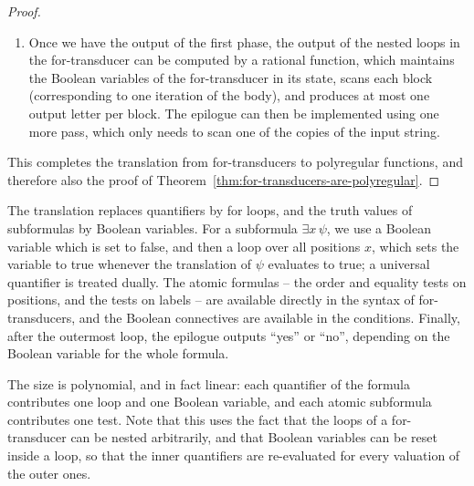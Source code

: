 \begin{proof}
\begin{enumerate}
  \item Once we have the output of the first phase, the output of the nested loops in the for-transducer can be computed by a rational function, which maintains the Boolean variables of the for-transducer in its state, scans each block (corresponding to one iteration of the body), and produces at most one output letter per block. The epilogue can then be implemented using one more pass, which only needs to scan one of the copies of the input string.
\end{enumerate}
This completes the translation from for-transducers to polyregular functions, and therefore also the proof of Theorem~\ref{thm:for-transducers-are-polyregular}.
\end{proof}

\exerciseheader

{The translation replaces quantifiers by for loops, and the truth values of subformulas by Boolean variables. For a subformula $\exists x\, \psi$, we use a Boolean variable which is set to false, and then a loop over all positions $x$, which sets the variable to true whenever the translation of $\psi$ evaluates to true; a universal quantifier is treated dually. The atomic formulas -- the order and equality tests on positions, and the tests on labels -- are available directly in the syntax of for-transducers, and the Boolean connectives are available in the conditions. Finally, after the outermost loop, the epilogue outputs ``yes'' or ``no'', depending on the Boolean variable for the whole formula.

The size is polynomial, and in fact linear: each quantifier of the formula contributes one loop and one Boolean variable, and each atomic subformula contributes one test. Note that this uses the fact that the loops of a for-transducer can be nested arbitrarily, and that Boolean variables can be reset inside a loop, so that the inner quantifiers are re-evaluated for every valuation of the outer ones.
}

